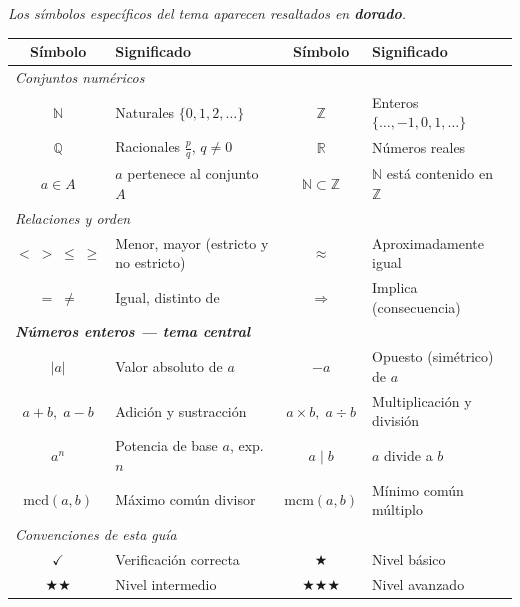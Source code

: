\documentclass[11pt, letterpaper]{article}
\begin{document}
\begin{tcolorbox}[importantbox, title={Glosario de simbolog\'ia}]
{\small\textit{Los s\'imbolos espec\'ificos del tema aparecen resaltados en \textcolor{zenitgold}{\textbf{dorado}}.}}
\medskip
\begin{center}
\renewcommand{\arraystretch}{1.32}
\begin{tabular}{c p{4.8cm} | c p{4.8cm}}
\toprule
\textbf{S\'imbolo} & \textbf{Significado} & \textbf{S\'imbolo} & \textbf{Significado}\\
\midrule
\multicolumn{4}{l}{\textit{Conjuntos num\'ericos}}\\
$\mathbb{N}$ & Naturales $\{0,1,2,\ldots\}$ &
$\mathbb{Z}$ & Enteros $\{\ldots,-1,0,1,\ldots\}$\\
$\mathbb{Q}$ & Racionales $\frac{p}{q}$, $q\neq 0$ &
$\mathbb{R}$ & N\'umeros reales\\
$a\in A$ & $a$ pertenece al conjunto $A$ &
$\mathbb{N}\subset\mathbb{Z}$ & $\mathbb{N}$ est\'a contenido en $\mathbb{Z}$\\[3pt]
\multicolumn{4}{l}{\textit{Relaciones y orden}}\\
$<\;>\;\leq\;\geq$ & Menor, mayor (estricto y no estricto) &
$\approx$ & Aproximadamente igual\\
$=\;\neq$ & Igual, distinto de &
$\Rightarrow$ & Implica (consecuencia)\\[3pt]
\multicolumn{4}{l}{\textit{\textcolor{zenitgold}{\textbf{N\'umeros enteros --- tema central}}}}\\
\textcolor{zenitgold}{$|a|$} & \textcolor{zenitgold}{Valor absoluto de $a$} &
\textcolor{zenitgold}{$-a$} & \textcolor{zenitgold}{Opuesto (sim\'etrico) de $a$}\\
\textcolor{zenitgold}{$a+b,\;a-b$} & \textcolor{zenitgold}{Adici\'on y sustracci\'on} &
\textcolor{zenitgold}{$a\times b,\;a\div b$} & \textcolor{zenitgold}{Multiplicaci\'on y divisi\'on}\\
\textcolor{zenitgold}{$a^n$} & \textcolor{zenitgold}{Potencia de base $a$, exp. $n$} &
\textcolor{zenitgold}{$a\mid b$} & \textcolor{zenitgold}{$a$ divide a $b$}\\
\textcolor{zenitgold}{$\text{mcd}(a,b)$} & \textcolor{zenitgold}{M\'aximo com\'un divisor} &
\textcolor{zenitgold}{$\text{mcm}(a,b)$} & \textcolor{zenitgold}{M\'inimo com\'un m\'ultiplo}\\[3pt]
\multicolumn{4}{l}{\textit{Convenciones de esta gu\'ia}}\\
$\checkmark$ & Verificaci\'on correcta &
$\bigstar$ & Nivel b\'asico\\
$\bigstar\bigstar$ & Nivel intermedio &
$\bigstar\bigstar\bigstar$ & Nivel avanzado\\
\bottomrule
\end{tabular}
\end{center}
\end{tcolorbox}
\end{document}
